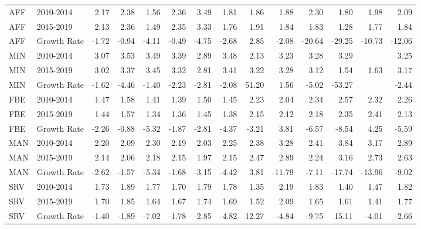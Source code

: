 \documentclass[a4paper]{article}
\begin{document}
\begin{table}[ht]
{\begin{tabular}{llrrrrrrrrrrrr}
  AFF & 2010-2014 & 2.17 & 2.38 & 1.56 & 2.36 & 3.49 & 1.81 & 1.86 & 1.88 & 2.30 & 1.80 & 1.98 & 2.09 \\ 
  AFF & 2015-2019 & 2.13 & 2.36 & 1.49 & 2.35 & 3.33 & 1.76 & 1.91 & 1.84 & 1.83 & 1.28 & 1.77 & 1.84 \\ 
  AFF & Growth Rate & -1.72 & -0.94 & -4.11 & -0.49 & -4.75 & -2.68 & 2.85 & -2.08 & -20.64 & -29.25 & -10.73 & -12.06 \\ 
  MIN & 2010-2014 & 3.07 & 3.53 & 3.49 & 3.39 & 2.89 & 3.48 & 2.13 & 3.23 & 3.28 & 3.29 &  & 3.25 \\ 
  MIN & 2015-2019 & 3.02 & 3.37 & 3.45 & 3.32 & 2.81 & 3.41 & 3.22 & 3.28 & 3.12 & 1.54 & 1.63 & 3.17 \\ 
  MIN & Growth Rate & -1.62 & -4.46 & -1.40 & -2.23 & -2.81 & -2.08 & 51.20 & 1.56 & -5.02 & -53.27 &  & -2.44 \\ 
  FBE & 2010-2014 & 1.47 & 1.58 & 1.41 & 1.39 & 1.50 & 1.45 & 2.23 & 2.04 & 2.34 & 2.57 & 2.32 & 2.26 \\ 
  FBE & 2015-2019 & 1.44 & 1.57 & 1.34 & 1.36 & 1.45 & 1.38 & 2.15 & 2.12 & 2.18 & 2.35 & 2.41 & 2.13 \\ 
  FBE & Growth Rate & -2.26 & -0.88 & -5.32 & -1.87 & -2.81 & -4.37 & -3.21 & 3.81 & -6.57 & -8.54 & 4.25 & -5.59 \\ 
  MAN & 2010-2014 & 2.20 & 2.09 & 2.30 & 2.19 & 2.03 & 2.25 & 2.38 & 3.28 & 2.41 & 3.84 & 3.17 & 2.89 \\ 
  MAN & 2015-2019 & 2.14 & 2.06 & 2.18 & 2.15 & 1.97 & 2.15 & 2.47 & 2.89 & 2.24 & 3.16 & 2.73 & 2.63 \\ 
  MAN & Growth Rate & -2.62 & -1.57 & -5.34 & -1.68 & -3.15 & -4.42 & 3.81 & -11.79 & -7.11 & -17.74 & -13.96 & -9.02 \\ 
  SRV & 2010-2014 & 1.73 & 1.89 & 1.77 & 1.70 & 1.79 & 1.78 & 1.35 & 2.19 & 1.83 & 1.40 & 1.47 & 1.82 \\ 
  SRV & 2015-2019 & 1.70 & 1.85 & 1.64 & 1.67 & 1.74 & 1.69 & 1.52 & 2.09 & 1.65 & 1.61 & 1.41 & 1.77 \\ 
  SRV & Growth Rate & -1.40 & -1.89 & -7.02 & -1.78 & -2.85 & -4.82 & 12.27 & -4.84 & -9.75 & 15.11 & -4.01 & -2.66 \\ 

\end{tabular}}
\end{table}
\end{document}

